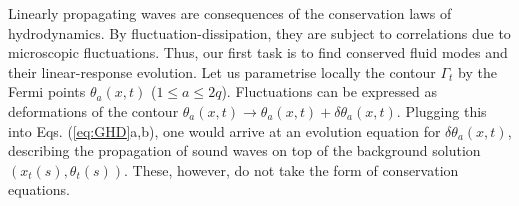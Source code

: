 \documentclass[twocolumn,amsfonts,showpacs,superscriptaddress]{revtex4-1}
\begin{document}
\vspace{0.1cm} \; Linearly propagating waves are consequences of the conservation laws of hydrodynamics. By fluctuation-dissipation, they are subject to correlations due to microscopic fluctuations. Thus, our first task is to find conserved fluid modes and their linear-response evolution. Let us parametrise locally the contour $\Gamma_t$ by the Fermi points $\theta_a(x,t)$ ($1 \leq a \leq 2q$). Fluctuations can be expressed as deformations of the contour $\theta_a(x,t)\rightarrow \theta_a(x,t)+\delta \theta_a(x,t)$. Plugging this into Eqs. (\ref{eq:GHD}a,b), one would arrive at an evolution equation for $\delta \theta_a (x,t)$, describing the propagation of sound waves on top of the background solution $(x_t (s) , \theta_t(s) )$. These, however, do not take the form of conservation equations.
\end{document}

